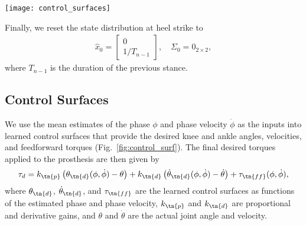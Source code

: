 \begin{figure*}[t]
    \centering
    \texttt{[image: control\_surfaces]}
    \caption[Examples of learned control surfaces]{Examples of learned control
    surfaces. We fit the surfaces to gait data from \citet{moore2015elaborate}.
    This data includes information for three speeds, , which are shown as the clustered trajectories in the above
    panels.  For an automatic transition to standing, the surfaces are
    additionally fit to virtual data that causes the joint angles to approach
    \unit[5]{deg}, the velocities to approach , and the
    joint torques to approach \unit[0]{N-m} as the phase velocity goes to
    zero.}\label{fig:control_surf}
\end{figure*}

Finally, we reset the state distribution at heel strike to
\begin{align}
    \hat{x}_0 = \begin{bmatrix} 0 \\ 1/T_{n-1} \end{bmatrix}, \quad \Sigma_0 
        =  0_{2 \times 2}, \label{eq:init_cond_ekf}
\end{align}
where $T_{n-1}$ is the duration of the previous stance.

\subsection{Control Surfaces}\label{sec:ctrl_surfs}

We use the mean estimates of the phase $\phi$ and phase velocity $\dot{\phi}$ as
the inputs into learned control surfaces that provide the desired knee and ankle
angles, velocities, and feedforward torques (Fig.~\ref{fig:control_surf}). The
final desired torques applied to the prosthesis are then given by 
\begin{align}
    \tau_d = k_\tn{p} \left(\theta_\tn{d}(\phi, \dot{\phi}) - \theta \right) 
        + k_\tn{d} \left(\dot{\theta}_\tn{d}(\phi, \dot{\phi}) 
            - \dot{\theta} \right)
        + \tau_\tn{ff}(\phi, \dot{\phi}), \label{eq:pdandff}
\end{align}
where $\theta_\tn{d}$, $\dot{\theta}_\tn{d}$, and $\tau_\tn{ff}$ are the
learned control surfaces as functions of the estimated phase and phase velocity,
$k_\tn{p}$ and $k_\tn{d}$ are proportional and derivative gains,
and $\theta$ and $\dot{\theta}$ are the actual joint angle and velocity.


